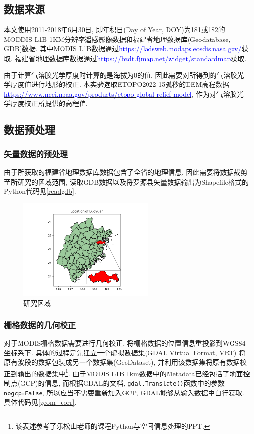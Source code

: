 \documentclass{ctexart}
\begin{document}
\begin{sloppypar}
\subsection{数据来源}
本文使用2011-2018年6月30日, 即年积日(Day of Year, DOY)为181或182的MODDIS L1B 1KM分辨率遥感影像数据和福建省地理数据库(Geodatabase, GDB)数据. 其中MODIS L1B数据通过\href{https://ladsweb.modaps.eosdis.nasa.gov/archive/allData/61/MOD02QKM/}{\textcolor{blue}{https://ladsweb.modaps.eosdis.nasa.gov/}}获取, 福建省地理数据库数据通过\href{https://bzdt.fjmap.net/widget/standardmap/search/search.html}{\textcolor{blue}{https://bzdt.fjmap.net/widget/standardmap}}获取. 

由于计算气溶胶光学厚度时计算的是海拔为0的值, 因此需要对所得到的气溶胶光学厚度值进行地形的校正. 
本实验选取ETOPO2022 15弧秒的DEM高程数据\href{https://www.ncei.noaa.gov/products/etopo-global-relief-model}{\textcolor{blue}{https://www.ncei.noaa.gov/products/etopo-global-relief-model}}\cite{etopo}, 作为对气溶胶光学厚度校正所提供的高程值. 

\subsection{数据预处理}
\subsubsection{矢量数据的预处理}
由于所获取的福建省地理数据库数据包含了全省的地理信息, 因此需要将数据裁剪至所研究的区域范围, 
读取GDB数据以及将罗源县矢量数据输出为Shapefile格式的Python代码见\ref{readgdb}.
\begin{figure}[h]
\centering
\includegraphics[width=0.6\textwidth]{./src/luoyuan.pdf}
\caption{研究区域}
\end{figure}
\subsubsection{栅格数据的几何校正}
对于MODIS栅格数据需要进行几何校正, 将栅格数据的位置信息重投影到WGS84坐标系下. 具体的过程是先建立一个虚拟数据集(GDAL Virtual Format, VRT)\cite{gdal}
将原有波段的数据包装成另一个数据集(GeoDataset), 并利用该数据集将原有数据校正到输出的数据集中\footnote{该表述参考了乐松山老师的课程Python与空间信息处理的PPT.}.
由于MODIS L1B 1km数据中的Metadata已经包括了地面控制点(GCP)的信息, 而根据GDAL的文档\cite{gdal}, \verb|gdal.Translate()|函数中的参数\verb|nogcp=False|, 所以应当不需要重新加入GCP, GDAL能够从输入数据中自行获取.
具体代码见\ref{geom_corr}. 


\end{sloppypar}
\end{document}
